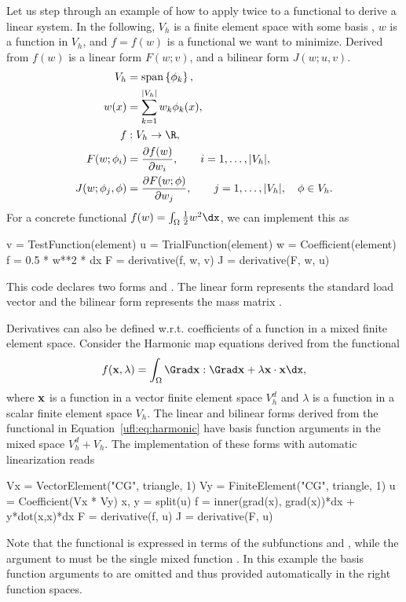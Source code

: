 Let us step through an example of how to apply 
twice to a functional to derive a linear system.  In the following,
$V_h$ is a finite element space with some basis , $w$ is a function in
$V_h$, and $f = f(w)$ is a functional we want to minimize. Derived
from $f(w)$ is a linear form $F(w; v)$, and a bilinear form
$J(w; u, v)$.
\begin{align}
V_h &= \spans{ \phi_k }, \\
w(x) &= \sum_{k=1}^{|V_h|} w_k \phi_k(x), \\
f&: V_h \rightarrow \R, \\
F(w; \phi_i) &= \frac{\partial f(w)}{\partial w_i},
  \qquad i=1,\ldots,|V_h|, \\
J(w; \phi_j, \phi) &= \frac{\partial F(w; \phi)}{\partial w_j},
  \qquad j=1,\ldots,|V_h|, \quad \phi\in V_h.
\end{align}
For a concrete functional $f(w) = \int_\Omega \frac 1 2 w^2 \dx$, we can implement this as
\begin{python}
v = TestFunction(element)
u = TrialFunction(element)
w = Coefficient(element)
f = 0.5 * w**2 * dx
F = derivative(f, w, v)
J = derivative(F, w, u)
\end{python}
This code declares two forms  and .  The linear form
 represents the standard load vector  and the
bilinear form  represents the mass matrix .

Derivatives can also be defined w.r.t. coefficients of a function in a
mixed finite element space.  Consider the Harmonic map equations
derived from the functional
\begin{align} \label{ufl:eq:harmonic}
f(\xx, \lambda) = \int_\Omega \Grad \xx : \Grad \xx + \lambda \xx\cdot\xx \dx,
\end{align}
where $\mathbf{x}$ is a function in a vector finite element space $V_h^d$ and
$\lambda$ is a function in a scalar finite element space $V_h$.  The
linear and bilinear forms derived from the functional in
Equation~\ref{ufl:eq:harmonic} have basis function arguments in the
mixed space $V_h^d + V_h$.  The implementation of these forms with
automatic linearization reads
\begin{python}
Vx = VectorElement("CG", triangle, 1)
Vy = FiniteElement("CG", triangle, 1)
u = Coefficient(Vx * Vy)
x, y = split(u)
f = inner(grad(x), grad(x))*dx + y*dot(x,x)*dx
F = derivative(f, u)
J = derivative(F, u)
\end{python}
Note that the functional is expressed in terms of the subfunctions
 and , while the argument to  must
be the single mixed function .  In this example the basis
function arguments to  are omitted and thus provided
automatically in the right function spaces.

